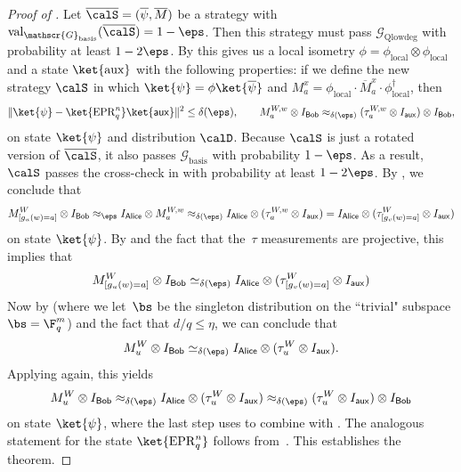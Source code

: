 \documentclass[11pt]{article}
\newcommand{\consistency}{\simeq}
\newcommand{\game}{\mathscr{G}}
\newcommand{\valstrat}[2]{\mathrm{val}_{#1}(#2)}
\newcommand{\reg}[1]{{\mathsf{#1}}}
\begin{document}
\begin{proof}[Proof of ]
Let $\overline{\calS} = (\overline{\psi}, \overline{M})$ be a strategy with $\valstrat{\game_{\mathrm{basis}}}{\overline{\calS}} = 1-\eps$.
Then this strategy must pass $\game_{\mathrm{Qlowdeg}}$ with probability at least $1-2\eps$.
By  this gives us a local isometry
$\phi = \phi_{\mathrm{local}}\otimes \phi_{\mathrm{local}}$ and a state $\ket{\mathrm{aux}}$
with the following properties:
if we define the new strategy $\calS$
in which $\ket{\psi} = \phi \ket{\overline{\psi}}$
and $M_a^x = \phi_{\mathrm{local}}\cdot \overline{M}_a^x \cdot \phi_{\mathrm{local}}^\dagger$, then
\begin{equation}\label{eq:cant-think-of-a-good-name}
\Vert \ket{\psi} - \ket{\mathrm{EPR}_q^n} \ket{\reg{aux}} \Vert^2 \leq \delta(\eps),
\qquad
M_a^{W,w} \otimes I_{\reg{Bob}}
\approx_{\delta(\eps)}
(\tau_a^{W,w} \otimes I_{\reg{aux}}) \otimes I_{\reg{Bob}},
\end{equation}
on state $\ket{\psi}$ and distribution $\calD$.
Because $\calS$ is just a rotated version of $\overline{\calS}$,
it also passes $\game_{\mathrm{basis}}$ with probability $1-\eps$.
As a result, $\calS$ passes the cross-check in  with probability at least $1-2\eps$.
By , we conclude that
\begin{equation}\label{eq:worth-studying}
M^W_{[g_u(w)=a]} \otimes I_{\reg{Bob}}
\approx_{\eps}
I_{\reg{Alice}} \otimes M^{W,w}_a
\approx_{\delta(\eps)} I_{\reg{Alice}} \otimes (\tau^{W,w}_a \otimes I_{\reg{aux}})
= I_{\reg{Alice}} \otimes (\tau^{W}_{[g_v(w)=a]} \otimes I_{\reg{aux}})
\end{equation}
on state $\ket{\psi}$.
By  and the fact that the~$\tau$ measurements are projective, this implies that
\begin{equation*}
M^W_{[g_u(w)=a]} \otimes I_{\reg{Bob}}
\consistency_{\delta(\eps)} I_{\reg{Alice}} \otimes (\tau^{W}_{[g_v(w)=a]} \otimes I_{\reg{aux}})
\end{equation*}
Now by
 (where we let~$\bs$ be the singleton distribution on the ``trivial" subspace $\bs = \F_q^m$)
and the fact that $d/q \leq \eta$, we can conclude that
\begin{equation*}
M^W_{u} \otimes I_{\reg{Bob}}
\consistency_{\delta(\eps)} I_{\reg{Alice}} \otimes (\tau^{W}_{u} \otimes I_{\reg{aux}}).
\end{equation*}
Applying  again, this yields
\begin{equation}\label{eq:almost-there-almost-there}
M_{u}^{W} \otimes I_{\reg{Bob}}
\approx_{\delta(\eps)} I_{\reg{Alice}} \otimes (\tau_{u}^{W} \otimes I_{\reg{aux}})
\approx_{\delta(\eps)} (\tau_{u}^W \otimes I_{\reg{aux}}) \otimes I_{\reg{Bob}}
\end{equation}
on state $\ket{\psi}$, where the last step uses 
to combine  with .
The analogous statement for the state $\ket{\mathrm{EPR}_q^n}$ follows from~.
This establishes the theorem.
\end{proof}
\end{document}
